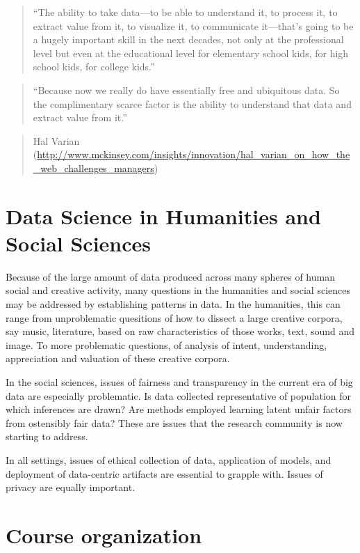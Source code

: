 \documentclass[12pt,]{book}
\theoremstyle{definition}
\theoremstyle{definition}
\theoremstyle{remark}
\begin{document}
\begin{quote}
``The ability to take data---to be able to understand it, to process it,
to extract value from it, to visualize it, to communicate it---that's
going to be a hugely important skill in the next decades, not only at
the professional level but even at the educational level for elementary
school kids, for high school kids, for college kids.''
\end{quote}

\begin{quote}
``Because now we really do have essentially free and ubiquitous data. So
the complimentary scarce factor is the ability to understand that data
and extract value from it.''
\end{quote}

\begin{quote}
Hal Varian
(\url{http://www.mckinsey.com/insights/innovation/hal_varian_on_how_the_web_challenges_managers})
\end{quote}

\section{Data Science in Humanities and Social
Sciences}\label{data-science-in-humanities-and-social-sciences}

Because of the large amount of data produced across many spheres of
human social and creative activity, many questions in the humanities and
social sciences may be addressed by establishing patterns in data. In
the humanities, this can range from unproblematic quesitions of how to
dissect a large creative corpora, say music, literature, based on raw
characteristics of those works, text, sound and image. To more
problematic questions, of analysis of intent, understanding,
appreciation and valuation of these creative corpora.

In the social sciences, issues of fairness and transparency in the
current era of big data are especially problematic. Is data collected
representative of population for which inferences are drawn? Are methods
employed learning latent unfair factors from ostensibly fair data? These
are issues that the research community is now starting to address.

In all settings, issues of ethical collection of data, application of
models, and deployment of data-centric artifacts are essential to
grapple with. Issues of privacy are equally important.

\section{Course organization}\label{course-organization}
\end{document}
